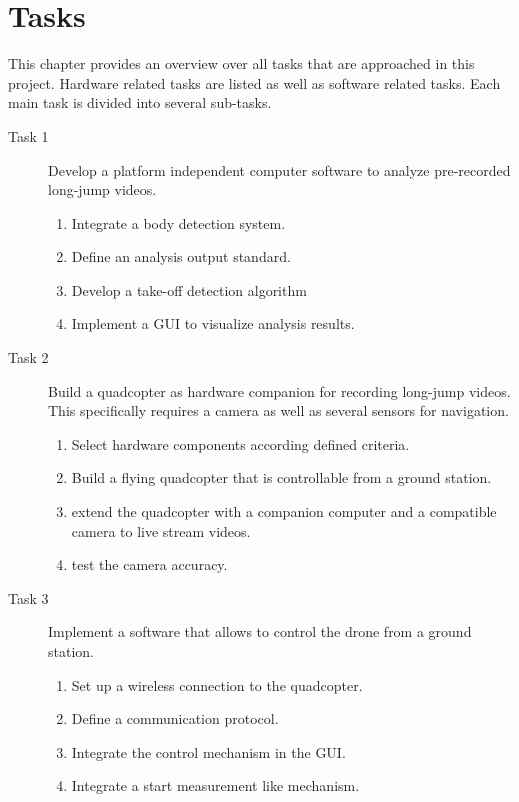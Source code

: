 \graphicspath{{./figures/}}
\chapter{Tasks}
This chapter provides an overview over all tasks that are approached in this
project.
Hardware related tasks are listed as well as software related tasks.
Each main task is divided into several sub-tasks.

\begin{description}
    \item[Task 1] Develop a platform independent computer software to analyze 
    pre-recorded long-jump videos.
    \begin{enumerate}
        \item Integrate a body detection system.
        \item Define an analysis output standard.
        \item Develop a take-off detection algorithm
        \item Implement a \acs*{GUI} to visualize analysis results.
    \end{enumerate}
    \item[Task 2] Build a quadcopter as hardware companion for recording 
    long-jump videos. This specifically requires a camera as well as several
    sensors for navigation.
    \begin{enumerate}
        \item Select hardware components according defined criteria.
        \item Build a flying quadcopter that is controllable from a ground
        station.
        \item extend the quadcopter with a companion computer and a compatible
        camera to live stream videos.
        \item test the camera accuracy.
    \end{enumerate}
    \item[Task 3] Implement a software that allows to control the drone from a
    ground station.
    \begin{enumerate}
        \item Set up a wireless connection to the quadcopter.
        \item Define a communication protocol.
        \item Integrate the control mechanism in the \acs*{GUI}.
        \item Integrate a start measurement like mechanism.
    \end{enumerate}

\end{description}
